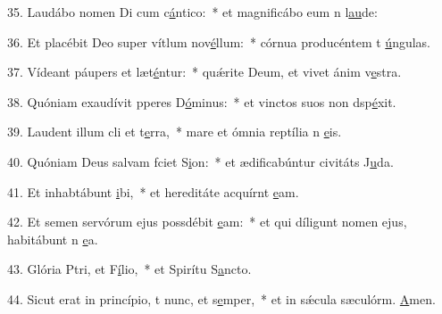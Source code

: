 35. Laudábo nomen Di cum c\uline{á}ntico:~* et magnificábo eum n l\uline{au}de:\par 
36. Et placébit Deo super vítlum nov\uline{é}llum:~* córnua producéntem t \uline{ú}ngulas.\par 
37. Vídeant páupers et læt\uline{é}ntur:~* quǽrite Deum, et vivet ánim v\uline{e}stra.\par 
38. Quóniam exaudívit pperes D\uline{ó}minus:~* et vinctos suos non dsp\uline{é}xit.\par 
39. Laudent illum cli et t\uline{e}rra,~* mare et ómnia reptília n \uline{e}is.\par 
40. Quóniam Deus salvam fciet S\uline{i}on:~* et ædificabúntur civitáts J\uline{u}da.\par 
41. Et inhabtábunt \uline{i}bi,~* et hereditáte acquírnt \uline{e}am.\par 
42. Et semen servórum ejus possdébit \uline{e}am:~* et qui díligunt nomen ejus, habitábunt n \uline{e}a.\par 
43. Glória Ptri, et F\uline{í}lio,~* et Spirítu S\uline{a}ncto.\par 
44. Sicut erat in princípio, t nunc, et s\uline{e}mper,~* et in sǽcula sæculórm. \uline{A}men.\par 
